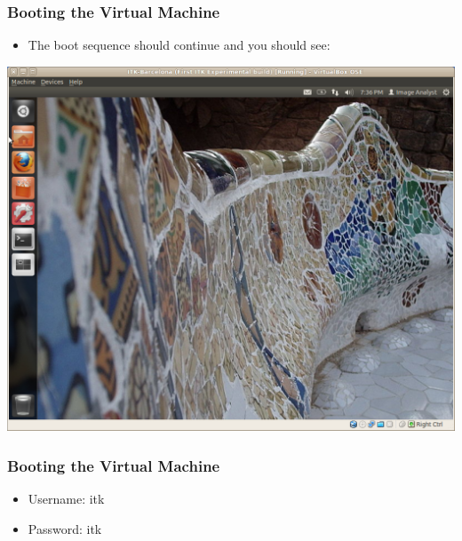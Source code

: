 \begin{frame}
\frametitle{Booting the Virtual Machine}
\begin{itemize}
\item The boot sequence should continue and you should see:
\end{itemize}
\begin{center}
  \includegraphics[width=0.7\paperwidth]{../Art/Screenshot-ITKv4-VirtualBox-01.jpg}
\end{center}
\end{frame}

\begin{frame}
\frametitle{Booting the Virtual Machine}
\begin{itemize}
\item Username: itk
\item Password: itk
\end{itemize}
\end{frame}




